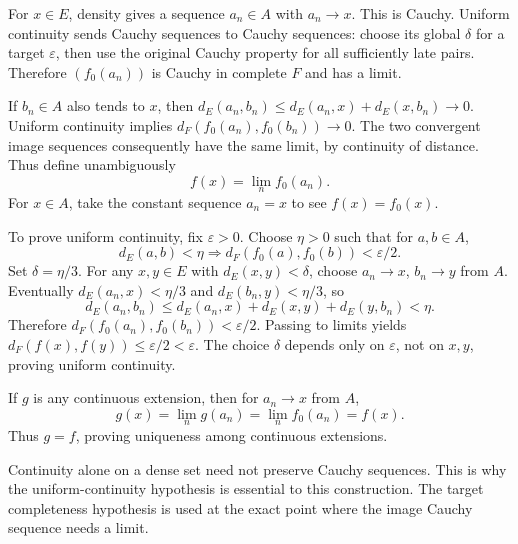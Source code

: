 \begin{answer}
For $x\in E$, density gives a sequence $a_n\in A$ with $a_n\to x$. This is Cauchy. Uniform continuity sends Cauchy sequences to Cauchy sequences: choose its global $\delta$ for a target $\varepsilon$, then use the original Cauchy property for all sufficiently late pairs. Therefore $(f_0(a_n))$ is Cauchy in complete $F$ and has a limit.

If $b_n\in A$ also tends to $x$, then $d_E(a_n,b_n)\le d_E(a_n,x)+d_E(x,b_n)\to0$. Uniform continuity implies $d_F(f_0(a_n),f_0(b_n))\to0$. The two convergent image sequences consequently have the same limit, by continuity of distance. Thus define unambiguously
\[f(x)=\lim_nf_0(a_n).\]
For $x\in A$, take the constant sequence $a_n=x$ to see $f(x)=f_0(x)$.

To prove uniform continuity, fix $\varepsilon>0$. Choose $\eta>0$ such that for $a,b\in A$,
\[d_E(a,b)<\eta\Rightarrow d_F(f_0(a),f_0(b))<\varepsilon/2.\]
Set $\delta=\eta/3$. For any $x,y\in E$ with $d_E(x,y)<\delta$, choose $a_n\to x$, $b_n\to y$ from $A$. Eventually $d_E(a_n,x)<\eta/3$ and $d_E(b_n,y)<\eta/3$, so
\[d_E(a_n,b_n)\le d_E(a_n,x)+d_E(x,y)+d_E(y,b_n)<\eta.\]
Therefore $d_F(f_0(a_n),f_0(b_n))<\varepsilon/2$. Passing to limits yields $d_F(f(x),f(y))\le\varepsilon/2<\varepsilon$. The choice $\delta$ depends only on $\varepsilon$, not on $x,y$, proving uniform continuity.

If $g$ is any continuous extension, then for $a_n\to x$ from $A$,
\[g(x)=\lim_ng(a_n)=\lim_nf_0(a_n)=f(x).\]
Thus $g=f$, proving uniqueness among continuous extensions.
\end{answer}
\begin{tip}
Continuity alone on a dense set need not preserve Cauchy sequences. This is why the uniform-continuity hypothesis is essential to this construction. The target completeness hypothesis is used at the exact point where the image Cauchy sequence needs a limit.
\end{tip}
